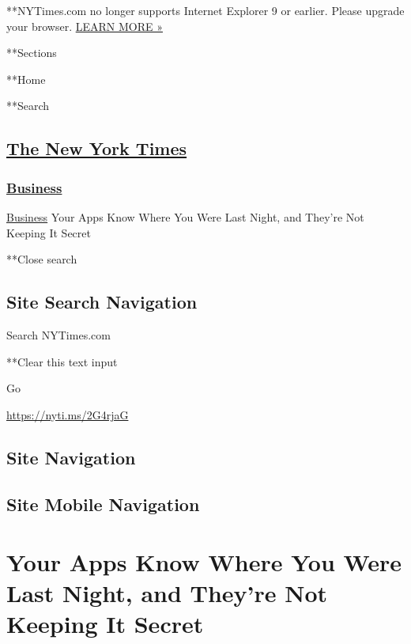  **NYTimes.com no longer supports Internet Explorer 9 or earlier. Please
upgrade your browser.
\href{http://www.nytimes.com/content/help/site/ie9-support.html}{LEARN
MORE »}

**Sections

**Home

**Search

\hypertarget{the-new-york-times}{%
\subsection{\texorpdfstring{\href{http://www.nytimes.com/}{The New York
Times}}{The New York Times}}\label{the-new-york-times}}

\hypertarget{-business-}{%
\subsubsection{\texorpdfstring{ \href{/section/business}{Business}
}{ Business }}\label{-business-}}

 \href{/section/business}{Business} \textbar{}Your Apps Know Where You
Were Last Night, and They're Not Keeping It Secret

**Close search

\hypertarget{site-search-navigation}{%
\subsection{Site Search Navigation}\label{site-search-navigation}}

Search NYTimes.com

**Clear this text input

Go

\url{https://nyti.ms/2G4rjaG}

\hypertarget{site-navigation}{%
\subsection{Site Navigation}\label{site-navigation}}

\hypertarget{site-mobile-navigation}{%
\subsection{Site Mobile Navigation}\label{site-mobile-navigation}}

\hypertarget{your-apps-know-where-you-were-last-night-and-theyre-not-keeping-it-secret}{%
\section{Your Apps Know Where You Were Last Night, and They're Not
Keeping It
Secret}\label{your-apps-know-where-you-were-last-night-and-theyre-not-keeping-it-secret}}

